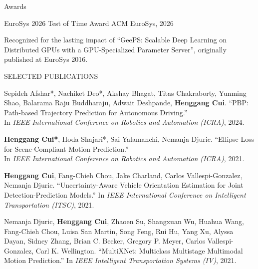 \documentclass{resume} %
\begin{document}


\begin{rSection}{Awards}
\vspace{-.1in}
    \item
    [1]
        EuroSys 2026 Test of Time Award  \hfill ACM EuroSys, 2026

        \footnotesize{
            Recognized for the lasting impact of ``GeePS: Scalable Deep Learning on Distributed GPUs with a GPU-Specialized Parameter Server'', originally published at EuroSys 2016.
        }

\end{rSection}

\begin{rSection}{SELECTED PUBLICATIONS}
\vspace{-.1in}
\footnotesize{
    \item
    [1]
        Sepideh Afshar*, Nachiket Deo*, Akshay Bhagat, Titas Chakraborty, Yunming Shao, Balarama Raju Buddharaju, Adwait Deshpande, {\bf Henggang Cui}.
        ``PBP: Path-based Trajectory Prediction for Autonomous Driving.'' \\
        In \emph{IEEE International Conference on Robotics and Automation (ICRA)}, 2024.
    \item
    [2]
        {\bf Henggang Cui*}, Hoda Shajari*, Sai Yalamanchi, Nemanja Djuric.
        ``Ellipse Loss for Scene-Compliant Motion Prediction.'' \\
        In \emph{IEEE International Conference on Robotics and Automation (ICRA)}, 2021.
    \item
    [3]
        {\bf Henggang Cui}, Fang-Chieh Chou, Jake Charland, Carlos Vallespi-Gonzalez, Nemanja Djuric.
        ``Uncertainty-Aware Vehicle Orientation Estimation for Joint Detection-Prediction Models.''
        In \emph{IEEE International Conference on Intelligent Transportation (ITSC)}, 2021.
    \item
    [4]
        Nemanja Djuric, {\bf Henggang Cui}, Zhaoen Su, Shangxuan Wu, Huahua Wang, Fang-Chieh Chou, Luisa San Martin, Song Feng, Rui Hu, Yang Xu, Alyssa Dayan, Sidney Zhang, Brian C. Becker, Gregory P. Meyer, Carlos Vallespi-Gonzalez, Carl K. Wellington.
        ``MultiXNet: Multiclass Multistage Multimodal Motion Prediction.''
        In \emph{IEEE Intelligent Transportation Systems (IV)}, 2021.
}
\end{rSection}
\end{document}

